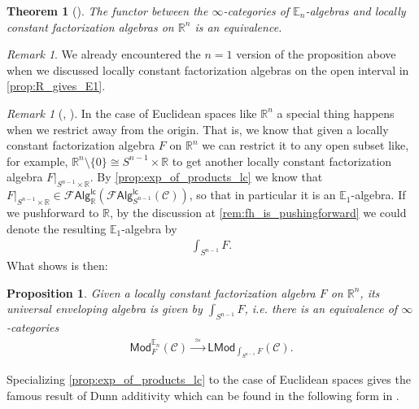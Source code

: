 \documentclass[12pt,a4paper]{article}
\newcounter{counter} \numberwithin{counter}{section}
\theoremstyle{definition}
\theoremstyle{plain}
\newtheorem{theorem}[counter]{Theorem}
\newtheorem{proposition}[counter]{Proposition}
\theoremstyle{remark}
\newtheorem{remark}[counter]{Remark}
\newcommand{\catC}{\mathscr{C}}
\newcommand{\lcfa}{\mathscr{F} \mathsf{Alg}^{\mathsf{lc}}}
\begin{document}
\begin{theorem}[{\cite{lurie_ha}}]
    The functor between the $\infty$-categories of $\mathbb{E}_n$-algebras and locally constant factorization algebras on $\mathbb{R}^n$ is an equivalence.
\end{theorem}

\begin{remark}
    We already encountered the $n=1$ version of the proposition above when we discussed locally constant factorization algebras on the open interval in \cref{prop:R_gives_E1}.
\end{remark}

\begin{remark}[{\cite[prop.3.16]{francis2013}, \cite[ex.5.5.4.16]{lurie_ha}}]
    In the case of Euclidean spaces like $\mathbb{R}^n$ a special thing happens when we restrict away from the origin. That is, we know that given a locally constant factorization algebra $F$ on $\mathbb{R}^n$ we can restrict it to any open subset like, for example, $\mathbb{R}^n \setminus \{ 0 \} \cong S^{n-1} \times \mathbb{R}$ to get another locally constant factorization algebra $F|_{S^{n-1} \times \mathbb{R}}$. By \cref{prop:exp_of_products_lc} we know that $F|_{S^{n-1} \times \mathbb{R}} \in \lcfa_{\mathbb{R}} (\lcfa_{S^{n-1}} (\catC))$, so that in particular it is an $\mathbb{E}_1$-algebra. If we pushforward to $\mathbb{R}$, by the discussion at \cref{rem:fh_is_pushingforward} we could denote the resulting $\mathbb{E}_1$-algebra by
    \begin{align}
        \int_{S^{n-1}} F.
    \end{align}
    What \cite[prop.3.16]{francis2013} shows is then:
\end{remark}

\begin{proposition}\label{univ_env_for_En}
    Given a locally constant factorization algebra $F$ on $\mathbb{R}^n$, its universal enveloping algebra is given by $\int_{S^{n-1}} F$, i.e. there is an equivalence of $\infty$-categories
    \begin{align}
        \mathsf{Mod}^{\mathbb{E}_n}_{F} (\catC) \xrightarrow{\ \ \simeq \ \ } \mathsf{LMod}_{\int_{S^{n-1}} F} (\catC).
    \end{align}
\end{proposition}

Specializing \cref{prop:exp_of_products_lc} to the case of Euclidean spaces gives the famous result of Dunn additivity \cite{dunn1988} which can be found in the following form in \cite{lurie_ha}.
\end{document}
